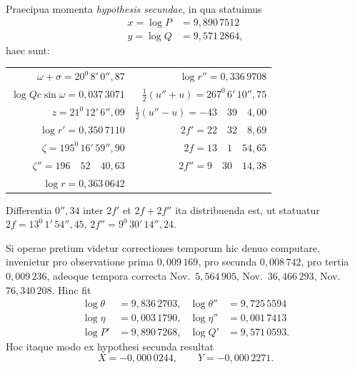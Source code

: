 Praecipua momenta \textit{hypothesis secundae}, in qua statuimus
\[
\begin{aligned}
x=\log P&=9{,}890\,7512\\
y=\log Q&=9{,}571\,2864,
\end{aligned}
\]
\noindent haec sunt:
\begin{center}\begingroup\footnotesize\setlength{\tabcolsep}{6pt}\renewcommand{\arraystretch}{1.3}
\begin{tabular}{r|r}
$\omega+\sigma=20^0\,8'\,0''{,}87$ & $\log r''=0{,}336\,9708$\\
$\log Qc\sin\omega=0{,}037\,3071$ & $\tfrac12(u''+u)=267^0\,6'\,10''{,}75$\\
$z=21^0\,12'\,6''{,}09$ & $\tfrac12(u''-u)=-43\quad39\quad4{,}00$\\
$\log r'=0{,}350\,7110$ & $2f'=22\quad32\quad8{,}69$\\
$\zeta=195^0\,16'\,59''{,}90$ & $2f=13\quad1\quad54{,}65$\\
$\zeta''=196\quad52\quad40{,}63$ & $2f''=9\quad30\quad14{,}38$\\
$\log r=0{,}363\,0642$ &
\end{tabular}\endgroup\end{center}
\noindent Differentia $0''{,}34$ inter $2f'$ et $2f+2f''$ ita distribuenda est, ut statuatur $2f=13^0\,1'\,54''{,}45$, $2f''=9^0\,30'\,14''{,}24$.

Si operae pretium videtur correctiones temporum hic denuo computare, invenietur pro observatione prima $0{,}009\,169$, pro secunda $0{,}008\,742$, pro tertia $0{,}009\,236$, adeoque tempora correcta Nov.\ $5{,}564\,905$, Nov.\ $36{,}466\,293$, Nov.\ $76{,}340\,208$. Hinc fit
\[
\begin{aligned}
\log\theta&=9{,}836\,2703,&\log\theta''&=9{,}725\,5594\\
\log\eta&=0{,}003\,1790,&\log\eta''&=0{,}001\,7413\\
\log P'&=9{,}890\,7268,&\log Q'&=9{,}571\,0593.
\end{aligned}
\]
\noindent Hoc itaque modo ex hypothesi secunda resultat
\[X=-0{,}000\,0244,\qquad Y=-0{,}000\,2271.\]

